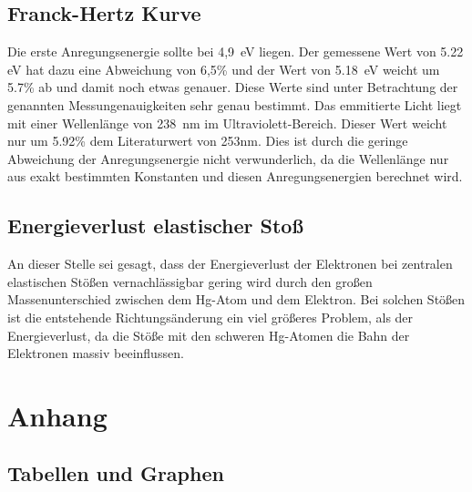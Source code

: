 \subsection{Franck-Hertz Kurve}

Die erste Anregungsenergie sollte bei 4,9\, eV liegen. Der gemessene Wert von 5.22\, eV hat dazu eine Abweichung von 6,5\% und der Wert von 5.18\, eV weicht um 5.7\% ab und damit noch etwas genauer. Diese Werte sind unter Betrachtung der genannten Messungenauigkeiten sehr genau bestimmt. 
Das emmitierte Licht liegt mit einer Wellenlänge von 238\, nm im Ultraviolett-Bereich. Dieser Wert weicht nur um 5.92\% dem Literaturwert von 253nm. Dies ist durch die geringe Abweichung der Anregungsenergie nicht verwunderlich, da die Wellenlänge nur aus exakt bestimmten Konstanten und diesen Anregungsenergien berechnet wird.

\subsection{Energieverlust elastischer Stoß}
An dieser Stelle sei gesagt, dass der Energieverlust der Elektronen bei zentralen elastischen Stößen vernachlässigbar gering wird durch den großen Massenunterschied zwischen dem Hg-Atom und dem Elektron. Bei solchen Stößen ist die entstehende Richtungsänderung ein viel größeres Problem, als der Energieverlust, da die Stöße mit den schweren Hg-Atomen die Bahn der Elektronen massiv beeinflussen.

\section{Anhang}
\subsection{Tabellen und Graphen}


